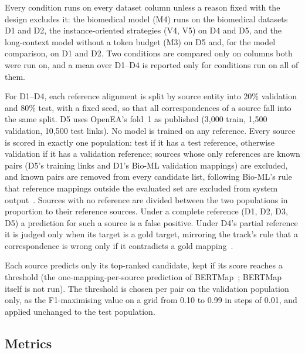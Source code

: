 Every condition runs on every dataset column unless a reason fixed with the
design excludes it: the biomedical model (M4) runs on the biomedical datasets
D1 and D2, the instance-oriented strategies (V4, V5) on D4 and D5, and the
long-context model without a token budget (M3) on D5 and, for the model
comparison, on D1 and D2. Two conditions are compared only on columns both
were run on, and a mean over D1--D4 is reported only for conditions run on
all of them.

For D1--D4, each reference alignment is split by source entity into 20\%
validation and 80\% test, with a fixed seed, so that all correspondences of a
source fall into the same split. D5 uses OpenEA's fold~1 as published (3,000
train, 1,500 validation, 10,500 test links). No model is trained on any
reference. Every source is scored in exactly one population: test if it has
a test reference, otherwise validation if it has a validation reference;
sources whose only references are known pairs (D5's training links and D1's
Bio-ML validation mappings) are excluded, and known pairs are removed from
every candidate list, following Bio-ML's rule that reference mappings outside
the evaluated set are excluded from system output~\cite{he2022bioml}. Sources
with no reference are divided between the two populations in proportion to
their reference sources. Under a complete reference (D1, D2, D3, D5) a
prediction for such a source is a false positive. Under D4's partial
reference it is judged only when its target is a gold target, mirroring the
track's rule that a correspondence is wrong only if it contradicts a gold
mapping~\cite{hertling2020kgtrack}.

Each source predicts only its top-ranked candidate, kept if its score reaches
a threshold (the one-mapping-per-source prediction of
BERTMap~\cite{he2022bertmap}; BERTMap itself is not run). The threshold is
chosen per pair on the validation population only, as the F1-maximising
value on a grid from 0.10 to 0.99 in steps of 0.01, and applied unchanged to
the test population.

\subsection{Metrics}
\label{sec:metrics}

